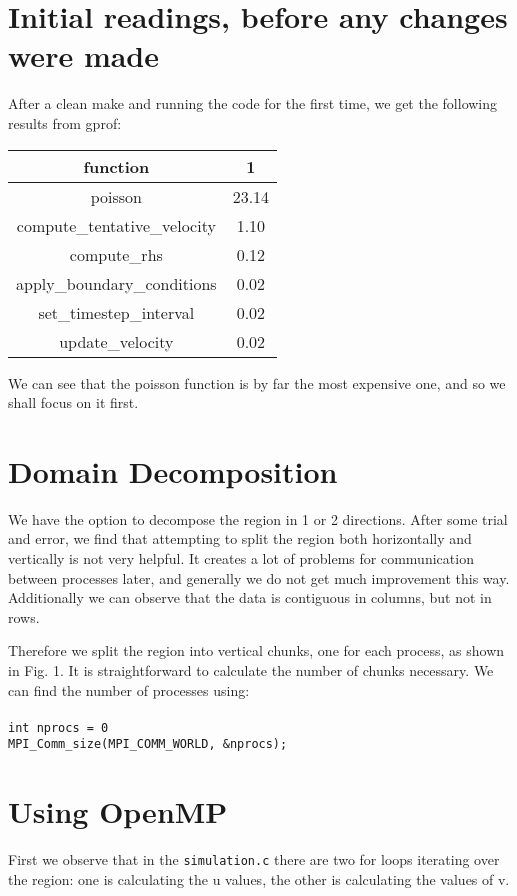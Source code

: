 \documentclass[11pt,journal]{article}
\newcommand\tab[1][1cm]{\hspace*{#1}}
\begin{document}
	\section{Initial readings, before any changes were made}
	After a clean make and running the code for the first time, we get the following results from gprof:
	\begin{table}[h]
		\centering
		\begin{tabular}{c|c}
			function & 1  \\
			\hline
			poisson & 23.14 \\
			compute\_tentative\_velocity & 1.10 \\
			compute\_rhs & 0.12 \\
			apply\_boundary\_conditions & 0.02 \\
			set\_timestep\_interval & 0.02 \\
			update\_velocity & 0.02\\
		\end{tabular}
	\end{table}

	We can see that the poisson function is by far the most expensive one, and so we shall focus on it first.
	
	\section{Domain Decomposition}
	
	We have the option to decompose the region in 1 or 2 directions. After some trial and error, we find that attempting to split the region both horizontally and vertically is not very helpful. It creates a lot of problems for communication between processes later, and generally we do not get much improvement this way. Additionally we can observe that the data is contiguous in columns, but not in rows.
	
	Therefore we split the region into vertical chunks, one for each process, as shown in Fig. 1. It is straightforward to calculate the number of chunks necessary. We can find the number of processes using:\\
	\tab\\
	\tab \texttt{int nprocs = 0}\\
	\tab \texttt{MPI\_Comm\_size(MPI\_COMM\_WORLD, \&nprocs);}
		


	\section{Using OpenMP}
	First we observe that in the \texttt{simulation.c} there are two for loops iterating over the region: one is calculating the u values, the other is calculating the values of v. 
	

\end{document}
